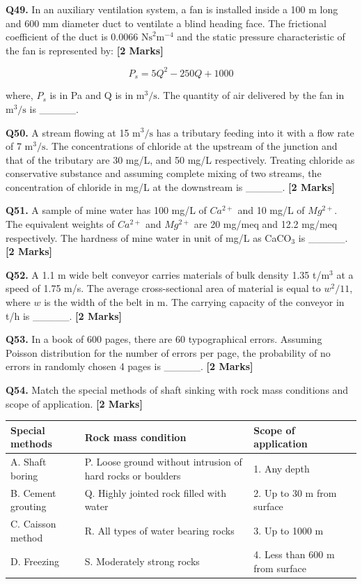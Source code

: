 \documentclass[11pt]{article}
\newcommand{\questionb}[2]{
    \noindent\textbf{Q#2.} #1 \hfill \textbf{[2 Marks]}
}
\begin{document}
\questionb{In an auxiliary ventilation system, a fan is installed inside a 100 m long and 600 mm diameter duct to ventilate a blind heading face. The frictional coefficient of the duct is 0.0066 \( \text{Ns}^2\text{m}^{-4} \) and the static pressure characteristic of the fan is represented by:}{49}

\[
P_s = 5Q^2 - 250Q + 1000
\]

where, \( P_s \) is in Pa and Q is in \( \text{m}^3/\text{s} \). The quantity of air delivered by the fan in \( \text{m}^3/\text{s} \) is \_\_\_\_\_.
\vspace{0.5cm}

\questionb{A stream flowing at 15 \( \text{m}^3/\text{s} \) has a tributary feeding into it with a flow rate of 7 \( \text{m}^3/\text{s} \). The concentrations of chloride at the upstream of the junction and that of the tributary are 30 mg/L, and 50 mg/L respectively. Treating chloride as conservative substance and assuming complete mixing of two streams, the concentration of chloride in mg/L at the downstream is \_\_\_\_\_.}{50}
\vspace{0.5cm}

\questionb{A sample of mine water has 100 mg/L of \( Ca^{2+} \) and 10 mg/L of \( Mg^{2+} \). The equivalent weights of \( Ca^{2+} \) and \( Mg^{2+} \) are 20 mg/meq and 12.2 mg/meq respectively. The hardness of mine water in unit of mg/L as CaCO\(_3\) is \_\_\_\_\_.}{51}
\vspace{0.5cm}

\questionb{A 1.1 m wide belt conveyor carries materials of bulk density 1.35 t/m\(^3\) at a speed of 1.75 m/s. The average cross-sectional area of material is equal to \( w^2 / 11 \), where \( w \) is the width of the belt in m. The carrying capacity of the conveyor in t/h is \_\_\_\_\_.}{52}
\vspace{0.5cm}

\questionb{In a book of 600 pages, there are 60 typographical errors. Assuming Poisson distribution for the number of errors per page, the probability of no errors in randomly chosen 4 pages is \_\_\_\_\_.}{53}
\vspace{0.5cm}

\questionb{Match the special methods of shaft sinking with rock mass conditions and scope of application.}{54}

\begin{center}
\begin{tabular}{|l|l|l|}
\hline
Special methods & Rock mass condition & Scope of application \\
\hline
A. Shaft boring & P. Loose ground without intrusion of hard rocks or boulders & 1. Any depth \\
B. Cement grouting & Q. Highly jointed rock filled with water & 2. Up to 30 m from surface \\
C. Caisson method & R. All types of water bearing rocks & 3. Up to 1000 m \\
D. Freezing & S. Moderately strong rocks & 4. Less than 600 m from surface \\
\hline
\end{tabular}
\end{center}
\end{document}
